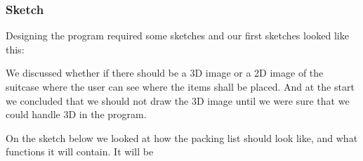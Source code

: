 \subsubsection{Sketch}

Designing the program required some sketches and our first sketches looked like this:


We discussed whether if there should be a 3D image or a 2D image of the suitcase where the user can see where the items shall be placed. And at the start we concluded that we should not draw the 3D image until we were sure that we could handle 3D in the program. 


On the sketch below we looked at how the packing list should look like, and what functions it will contain.
It will be







